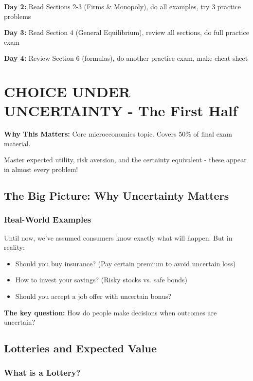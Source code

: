 \documentclass[10pt,letterpaper]{article}
\begin{document}
\textbf{Day 2:} Read Sections 2-3 (Firms \& Monopoly), do all examples, try 3 practice problems

\textbf{Day 3:} Read Section 4 (General Equilibrium), review all sections, do full practice exam

\textbf{Day 4:} Review Section 6 (formulas), do another practice exam, make cheat sheet

\newpage

\section{CHOICE UNDER UNCERTAINTY - The First Half}

\begin{criticalbox}
\textbf{Why This Matters:} Core microeconomics topic. Covers 50\% of final exam material.

Master expected utility, risk aversion, and the certainty equivalent - these appear in almost every problem!
\end{criticalbox}

\subsection{The Big Picture: Why Uncertainty Matters}

\subsubsection{Real-World Examples}

Until now, we've assumed consumers know exactly what will happen. But in reality:
\begin{itemize}
  \item Should you buy insurance? (Pay certain premium to avoid uncertain loss)
  \item How to invest your savings? (Risky stocks vs. safe bonds)
  \item Should you accept a job offer with uncertain bonus?
\end{itemize}

\textbf{The key question:} How do people make decisions when outcomes are uncertain?

\subsection{Lotteries and Expected Value}

\subsubsection{What is a Lottery?}
\end{document}
